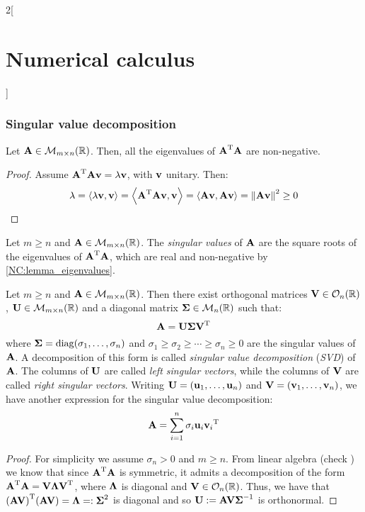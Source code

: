 \documentclass[../../../main_math.tex]{subfiles}
\begin{document}
\begin{multicols}{2}[\section{Numerical calculus}]
  \subsubsection{Singular value decomposition}
  \begin{lemma}\label{NC:lemma_eigenvalues}
    Let $\boldsymbol{\mathrm{A}}\in\mathcal{M}_{m\times n}(\mathbb{R})$. Then, all the eigenvalues of ${\boldsymbol{\mathrm{A}}}^{\mathrm{T}}\boldsymbol{\mathrm{A}}$ are non-negative.
  \end{lemma}
  \begin{proof}
    Assume ${\boldsymbol{\mathrm{A}}}^{\mathrm{T}}\boldsymbol{\mathrm{A}}\boldsymbol{\mathrm{v}}=\lambda\boldsymbol{\mathrm{v}}$, with $\boldsymbol{\mathrm{v}}$ unitary. Then:
    $$
      \lambda={\left\langle\lambda \boldsymbol{\mathrm{v}},\boldsymbol{\mathrm{v}}\right\rangle}={\left\langle{\boldsymbol{\mathrm{A}}}^{\mathrm{T}}\boldsymbol{\mathrm{A}}\boldsymbol{\mathrm{v}},\boldsymbol{\mathrm{v}}\right\rangle}={\left\langle\boldsymbol{\mathrm{A}}\boldsymbol{\mathrm{v}},\boldsymbol{\mathrm{A}}\boldsymbol{\mathrm{v}}\right\rangle}=\left\|\boldsymbol{\mathrm{A}}\boldsymbol{\mathrm{v}}\right\|^2\geq0
    $$
  \end{proof}
  \begin{definition}
    Let $m\geq n$ and $\boldsymbol{\mathrm{A}}\in\mathcal{M}_{m\times n}(\mathbb{R})$. The \emph{singular values} of $\boldsymbol{\mathrm{A}}$ are the square roots of the eigenvalues of ${\boldsymbol{\mathrm{A}}}^{\mathrm{T}}\boldsymbol{\mathrm{A}}$, which are real and non-negative by \ref{NC:lemma_eigenvalues}.
  \end{definition}
  \begin{theorem}\label{NC:svd}
    Let $m\geq n$ and $\boldsymbol{\mathrm{A}}\in\mathcal{M}_{m\times n}(\mathbb{R})$. Then there exist orthogonal matrices $\boldsymbol{\mathrm{V}}\in\mathcal{O}_{n}(\mathbb{R})$, $\boldsymbol{\mathrm{U}}\in\mathcal{M}_{m\times n}(\mathbb{R})$ and a diagonal matrix $\boldsymbol{\mathrm{\Sigma}}\in\mathcal{M}_{n}(\mathbb{R})$ such that:
    $$
      \boldsymbol{\mathrm{A}} = \boldsymbol{\mathrm{U}}\boldsymbol{\mathrm{\Sigma}}{\boldsymbol{\mathrm{V}}}^{\mathrm{T}}
    $$
    where $\boldsymbol{\mathrm{\Sigma}}=\operatorname{diag}(\sigma_1, \ldots, \sigma_n)$ and $\sigma_1\geq\sigma_2\geq\cdots\geq\sigma_n\geq0$ are the singular values of $\boldsymbol{\mathrm{A}}$. A decomposition of this form is called \emph{singular value decomposition} (\emph{SVD}) of $\boldsymbol{\mathrm{A}}$. The columns of $\boldsymbol{\mathrm{U}}$ are called \emph{left singular vectors}, while the columns of $\boldsymbol{\mathrm{V}}$ are called \emph{right singular vectors}. Writing $\boldsymbol{\mathrm{U}}= (\boldsymbol{\mathrm{u}}_1, \ldots, \boldsymbol{\mathrm{u}}_n)$ and $\boldsymbol{\mathrm{V}}= (\boldsymbol{\mathrm{v}}_1, \ldots, \boldsymbol{\mathrm{v}}_n)$, we have another expression for the singular value decomposition:
    \begin{equation}\label{NC:eq_svd}
      \boldsymbol{\mathrm{A}} = \sum_{i=1}^n \sigma_i \boldsymbol{\mathrm{u}}_i{\boldsymbol{\mathrm{v}}_i}^{\mathrm{T}}
    \end{equation}
  \end{theorem}
  \begin{proof}
    For simplicity we assume $\sigma_n>0$ and $m\geq n$. From linear algebra (check ) we know that since ${\boldsymbol{\mathrm{A}}}^{\mathrm{T}}\boldsymbol{\mathrm{A}}$ is symmetric, it admits a decomposition of the form ${\boldsymbol{\mathrm{A}}}^{\mathrm{T}}\boldsymbol{\mathrm{A}}=\boldsymbol{\mathrm{V}}\boldsymbol{\mathrm{\Lambda}}{\boldsymbol{\mathrm{V}}}^{\mathrm{T}}$, where $\boldsymbol{\mathrm{\Lambda}}$ is diagonal and $\boldsymbol{\mathrm{V}}\in \mathcal{O}_n(\mathbb{R})$. Thus, we have that ${(\boldsymbol{\mathrm{AV}})}^{\mathrm{T}}(\boldsymbol{\mathrm{AV}})=\boldsymbol{\mathrm{\Lambda}}=:\boldsymbol{\mathrm{\Sigma}}^2$ is diagonal and so $\boldsymbol{\mathrm{U}}:=\boldsymbol{\mathrm{AV}}\boldsymbol{\mathrm{\Sigma}}^{-1}$ is orthonormal.

\end{proof}
\end{multicols}
\end{document}
